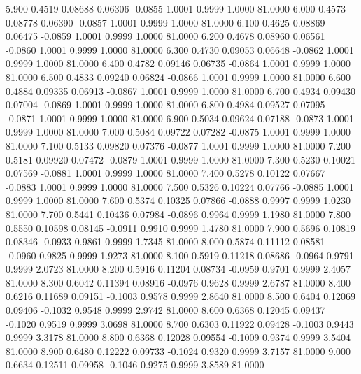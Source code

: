    5.900   0.4519   0.08688   0.06306  -0.0855   1.0001   0.9999   1.0000  81.0000
   6.000   0.4573   0.08778   0.06390  -0.0857   1.0001   0.9999   1.0000  81.0000
   6.100   0.4625   0.08869   0.06475  -0.0859   1.0001   0.9999   1.0000  81.0000
   6.200   0.4678   0.08960   0.06561  -0.0860   1.0001   0.9999   1.0000  81.0000
   6.300   0.4730   0.09053   0.06648  -0.0862   1.0001   0.9999   1.0000  81.0000
   6.400   0.4782   0.09146   0.06735  -0.0864   1.0001   0.9999   1.0000  81.0000
   6.500   0.4833   0.09240   0.06824  -0.0866   1.0001   0.9999   1.0000  81.0000
   6.600   0.4884   0.09335   0.06913  -0.0867   1.0001   0.9999   1.0000  81.0000
   6.700   0.4934   0.09430   0.07004  -0.0869   1.0001   0.9999   1.0000  81.0000
   6.800   0.4984   0.09527   0.07095  -0.0871   1.0001   0.9999   1.0000  81.0000
   6.900   0.5034   0.09624   0.07188  -0.0873   1.0001   0.9999   1.0000  81.0000
   7.000   0.5084   0.09722   0.07282  -0.0875   1.0001   0.9999   1.0000  81.0000
   7.100   0.5133   0.09820   0.07376  -0.0877   1.0001   0.9999   1.0000  81.0000
   7.200   0.5181   0.09920   0.07472  -0.0879   1.0001   0.9999   1.0000  81.0000
   7.300   0.5230   0.10021   0.07569  -0.0881   1.0001   0.9999   1.0000  81.0000
   7.400   0.5278   0.10122   0.07667  -0.0883   1.0001   0.9999   1.0000  81.0000
   7.500   0.5326   0.10224   0.07766  -0.0885   1.0001   0.9999   1.0000  81.0000
   7.600   0.5374   0.10325   0.07866  -0.0888   0.9997   0.9999   1.0230  81.0000
   7.700   0.5441   0.10436   0.07984  -0.0896   0.9964   0.9999   1.1980  81.0000
   7.800   0.5550   0.10598   0.08145  -0.0911   0.9910   0.9999   1.4780  81.0000
   7.900   0.5696   0.10819   0.08346  -0.0933   0.9861   0.9999   1.7345  81.0000
   8.000   0.5874   0.11112   0.08581  -0.0960   0.9825   0.9999   1.9273  81.0000
   8.100   0.5919   0.11218   0.08686  -0.0964   0.9791   0.9999   2.0723  81.0000
   8.200   0.5916   0.11204   0.08734  -0.0959   0.9701   0.9999   2.4057  81.0000
   8.300   0.6042   0.11394   0.08916  -0.0976   0.9628   0.9999   2.6787  81.0000
   8.400   0.6216   0.11689   0.09151  -0.1003   0.9578   0.9999   2.8640  81.0000
   8.500   0.6404   0.12069   0.09406  -0.1032   0.9548   0.9999   2.9742  81.0000
   8.600   0.6368   0.12045   0.09437  -0.1020   0.9519   0.9999   3.0698  81.0000
   8.700   0.6303   0.11922   0.09428  -0.1003   0.9443   0.9999   3.3178  81.0000
   8.800   0.6368   0.12028   0.09554  -0.1009   0.9374   0.9999   3.5404  81.0000
   8.900   0.6480   0.12222   0.09733  -0.1024   0.9320   0.9999   3.7157  81.0000
   9.000   0.6634   0.12511   0.09958  -0.1046   0.9275   0.9999   3.8589  81.0000
